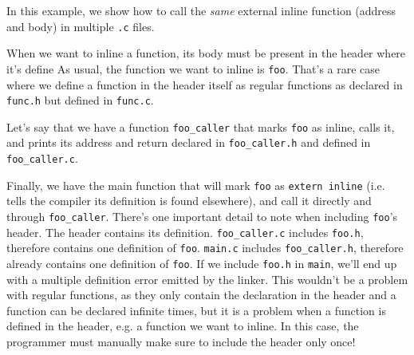 \documentclass[a4paper]{article}
\begin{document}
\begin{exmp}\;

\textup{
In this example, we show how to call the \textit{same} external inline function (address and body) in multiple \texttt{.c} files.
}

\textup{
When we want to inline a function, its body must be present in the header where it's define As usual, the function we want to inline is \texttt{foo}. That's a rare case where we define a function in the header itself as regular functions as declared in \texttt{func.h} but defined in \texttt{func.c}.
}



Let's say that we have a function \texttt{foo\_caller} that marks \texttt{foo} as inline, calls it, and prints its address and return declared in \texttt{foo\_caller.h} and defined in \texttt{foo\_caller.c}.








Finally, we have the main function that will mark \texttt{foo} as \texttt{extern inline} (i.e. tells the compiler its definition is found elsewhere), and call it directly and through \texttt{foo\_caller}. There's one important detail to note when including \texttt{foo}'s header. The header contains its definition. \texttt{foo\_caller.c} includes \texttt{foo.h}, therefore contains one definition of \texttt{foo}. \texttt{main.c} includes \texttt{foo\_caller.h}, therefore already contains one definition of \texttt{foo}. If we include \texttt{foo.h} in \texttt{main}, we'll end up with a multiple definition error emitted by the linker. This wouldn't be a problem with regular functions, as they only contain the declaration in the header and a function can be declared infinite times, but it is a problem when a function is defined in the header, e.g. a function we want to inline. In this case, the programmer must manually make sure to include the header only once!


\end{exmp}
\end{document}
